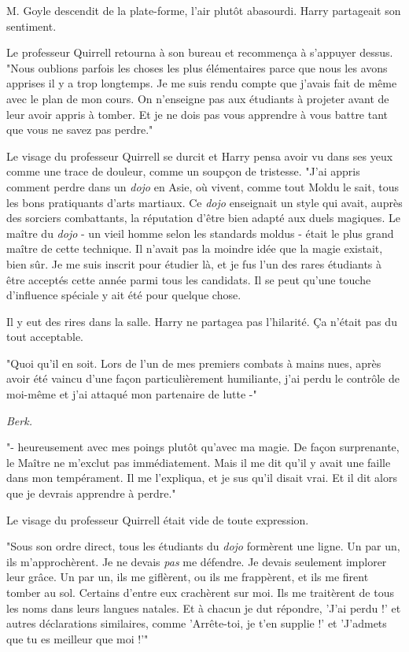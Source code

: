 M. Goyle descendit de la plate-forme, l'air plutôt abasourdi. Harry partageait son sentiment.

Le professeur Quirrell retourna à son bureau et recommença à s'appuyer dessus. "Nous oublions parfois les choses les plus élémentaires parce que nous les avons apprises il y a trop longtemps. Je me suis rendu compte que j'avais fait de même avec le plan de mon cours. On n'enseigne pas aux étudiants à projeter avant de leur avoir appris à tomber. Et je ne dois pas vous apprendre à vous battre tant que vous ne savez pas perdre."

Le visage du professeur Quirrell se durcit et Harry pensa avoir vu dans ses yeux comme une trace de douleur, comme un soupçon de tristesse. "J'ai appris comment perdre dans un \emph{dojo}  en Asie, où vivent, comme tout Moldu le sait, tous les bons pratiquants d'arts martiaux. Ce \emph{dojo}  enseignait un style qui avait, auprès des sorciers combattants, la réputation d'être bien adapté aux duels magiques. Le maître du \emph{dojo}  - un vieil homme selon les standards moldus - était le plus grand maître de cette technique. Il n'avait pas la moindre idée que la magie existait, bien sûr. Je me suis inscrit pour étudier là, et je fus l'un des rares étudiants à être acceptés cette année parmi tous les candidats. Il se peut qu'une touche d'influence spéciale y ait été pour quelque chose.

Il y eut des rires dans la salle. Harry ne partagea pas l'hilarité. Ça n'était pas du tout acceptable.

"Quoi qu'il en soit. Lors de l'un de mes premiers combats à mains nues, après avoir été vaincu d'une façon particulièrement humiliante, j'ai perdu le contrôle de moi-même et j'ai attaqué mon partenaire de lutte -"

\emph{Berk.} 

"- heureusement avec mes poings plutôt qu'avec ma magie. De façon surprenante, le Maître ne m'exclut pas immédiatement. Mais il me dit qu'il y avait une faille dans mon tempérament. Il me l'expliqua, et je sus qu'il disait vrai. Et il dit alors que je devrais apprendre à perdre."

Le visage du professeur Quirrell était vide de toute expression.

"Sous son ordre direct, tous les étudiants du \emph{dojo}  formèrent une ligne. Un par un, ils m'approchèrent. Je ne devais \emph{pas}  me défendre. Je devais seulement implorer leur grâce. Un par un, ils me giflèrent, ou ils me frappèrent, et ils me firent tomber au sol. Certains d'entre eux crachèrent sur moi. Ils me traitèrent de tous les noms dans leurs langues natales. Et à chacun je dut répondre, 'J'ai perdu !' et autres déclarations similaires, comme 'Arrête-toi, je t'en supplie !' et 'J'admets que tu es meilleur que moi !'"

